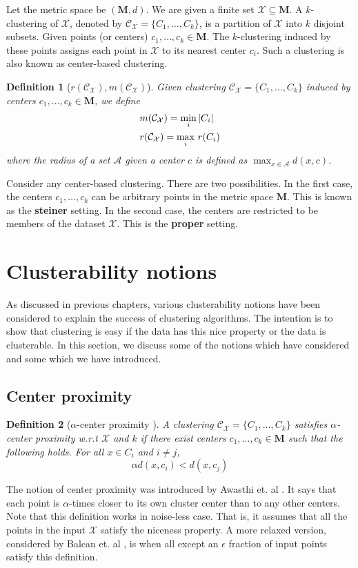 \documentclass[letterpaper,12pt,titlepage,oneside,final]{book}
\newtheorem{definition}{Definition}
\newcommand{\mc}{\mathcal}
\newcommand{\mb}{\mathbf}
\begin{document}
Let the metric space be $(\mb M, d)$. We are given a finite set $\mc X \subseteq \mb M$. A $k$-clustering of $\mc X$, denoted by $\mc C_{\mc X} = \{C_1, \ldots, C_k\}$, is a partition of $\mc X$ into $k$ disjoint subsets. Given points (or centers) $c_1, \ldots, c_k \in \mb M$. The $k$-clustering induced by these points assigns each point in $\mc X$ to its nearest center $c_i$. Such a clustering is also known as center-based clustering.

\begin{definition}[$r(\mc C_{\mc X}), m(\mc C_{\mc X})$]
Given clustering $\mc C_{\mc X} = \{C_1, \ldots, C_k\}$ induced by centers $c_1, \ldots, c_k \in \mb M$, we define 
\begin{align*}
&m(\mc{C}_{\mc{X}}) = \min_i |C_i|\\
&r(\mc{C}_{\mc{X}}) = \max_i \thinspace r(C_i)
\end{align*}
where the radius of a set $\mc A$ given a center $c$ is defined as $\max_{x \in \mc A} d(x, c)$.
\end{definition}

\noindent Consider any center-based clustering. There are two possibilities. In the first case, the centers $c_1, \ldots, c_k$ can be arbitrary points in the metric space $\mb M$. This is known as the \textbf{steiner} setting. In the second case, the centers are restricted to be members of the dataset $\mc X$. This is the \textbf{proper} setting. 

\section{Clusterability notions}
As discussed in previous chapters, various clusterability notions have been considered to explain the success of clustering algorithms. The intention is to show that clustering is easy if the data has this nice property or the data is clusterable. In this section, we discuss some of the notions which have considered and some which we have introduced.

\subsection{Center proximity}
\begin{definition}[$\alpha$-center proximity \cite{awasthi2012center}]
\label{defn:alphacp}
A clustering $\mc C_{\mc X} = \{C_1, \ldots, C_k\}$ satisfies $\alpha$-center proximity w.r.t $\mc X$ and $k$ if there exist centers $c_1, \ldots, c_k \in \mb M$  such that the following holds. For all $x \in C_i$ and $i\neq j$, $$\alpha d(x, c_i) < d(x, c_j)$$
\end{definition}
The notion of center proximity was introduced by Awasthi et. al \cite{awasthi2012center}. It says that each point is $\alpha$-times closer to its own cluster center than to any other centers. Note that this definition works in noise-less case. That is, it assumes that all the points in the input $\mc X$ satisfy the niceness property. A more relaxed version, considered by Balcan et. al \cite{balcan2012clustering}, is when all except an $\epsilon$ fraction of input points satisfy this definition. 
\end{document}
